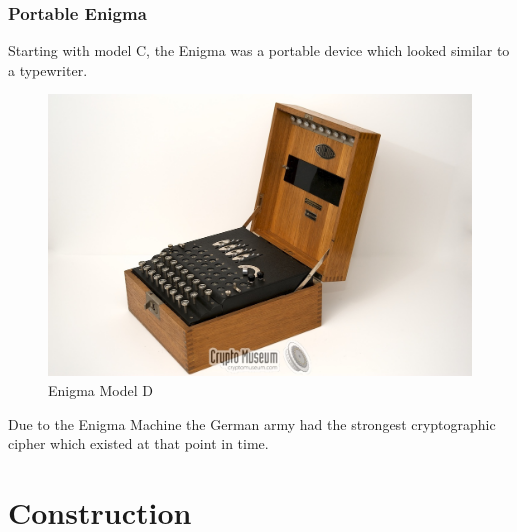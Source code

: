 \documentclass{beamer}
\newcommand{\<}{\langle}
\renewcommand{\>}{\rangle}
\begin{document}
\begin{frame}
\frametitle{Portable Enigma}

Starting with model C, the Enigma was a portable device which looked similar to a typewriter.  

\begin{figure}
\includegraphics[scale=.1]{IMG/modelD.jpg}
\caption{\scriptsize Enigma Model D}
\end{figure}

Due to the Enigma Machine the German army had the strongest cryptographic cipher which existed at that point in time. 
\end{frame}


\section{Construction}
\end{document}
